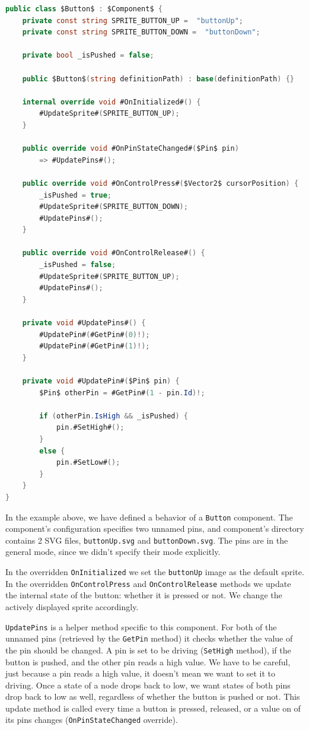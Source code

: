 \begin{lstlisting}[language=csharp, caption={\texttt{Button.cs}}]
public class $Button$ : $Component$ {
    private const string SPRITE_BUTTON_UP =  "buttonUp";
    private const string SPRITE_BUTTON_DOWN =  "buttonDown";
    
    private bool _isPushed = false;

    public $Button$(string definitionPath) : base(definitionPath) {}

    internal override void #OnInitialized#() {
        #UpdateSprite#(SPRITE_BUTTON_UP);
    }

    public override void #OnPinStateChanged#($Pin$ pin) 
        => #UpdatePins#();

    public override void #OnControlPress#($Vector2$ cursorPosition) {
        _isPushed = true;
        #UpdateSprite#(SPRITE_BUTTON_DOWN);
        #UpdatePins#();
    }

    public override void #OnControlRelease#() {
        _isPushed = false;
        #UpdateSprite#(SPRITE_BUTTON_UP);
        #UpdatePins#();
    }

    private void #UpdatePins#() {
        #UpdatePin#(#GetPin#(0)!);
        #UpdatePin#(#GetPin#(1)!);
    }

    private void #UpdatePin#($Pin$ pin) {
        $Pin$ otherPin = #GetPin#(1 - pin.Id)!;

        if (otherPin.IsHigh && _isPushed) {
            pin.#SetHigh#();
        }
        else {
            pin.#SetLow#();
        }
    }
}
\end{lstlisting}

In the example above, we have defined a behavior of a \texttt{Button} component. The component's configuration specifies two unnamed pins, and component's directory contains 2 SVG files, \texttt{buttonUp.svg} and \texttt{buttonDown.svg}. The pins are in the general mode, since we didn't specify their mode explicitly.

In the overridden \texttt{OnInitialized} we set the \texttt{buttonUp} image as the default sprite. In the overridden \texttt{OnControlPress} and \texttt{OnControlRelease} methods we update the internal state of the button: whether it is pressed or not. We change the actively displayed sprite accordingly.

\texttt{UpdatePins} is a helper method specific to this component. For both of the unnamed pins (retrieved by the \texttt{GetPin} method) it checks whether the value of the pin should be changed. A pin is set to be driving (\texttt{SetHigh} method), if the button is pushed, and the other pin reads a high value. We have to be careful, just because a pin reads a high value, it doesn't mean we want to set it to driving. Once a state of a node drops back to low, we want states of both pins drop back to low as well, regardless of whether the button is pushed or not. \footnotemark This update method is called every time a button is pressed, released, or a value on of its pins changes (\texttt{OnPinStateChanged} override).

